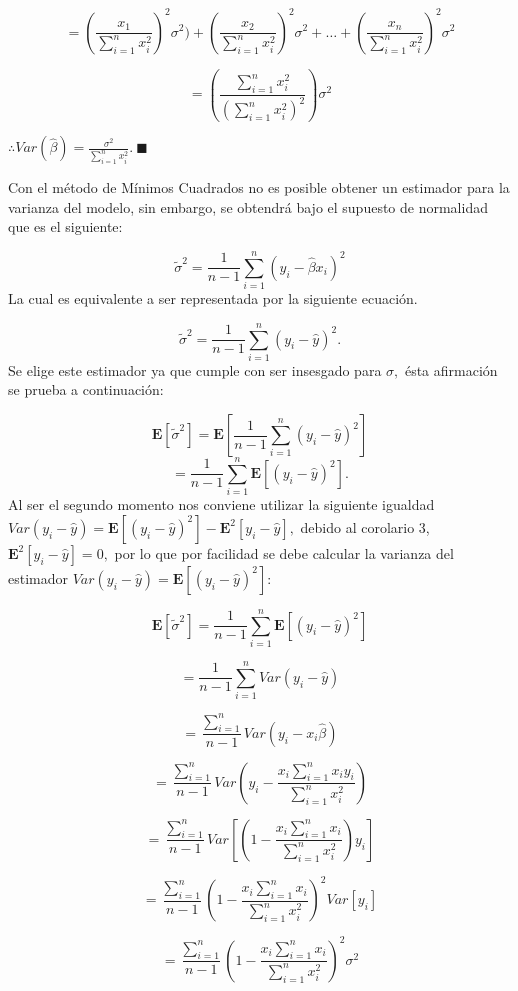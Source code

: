 \documentclass[
  a4paper,
  oneside,
  openany]{book}
\begin{document}
\[=\left(\frac{x_{1}}{\sum_{i=1}^{n}x_{i}^2}\right)^2\sigma^2) + \left(\frac{x_{2}}{\sum_{i=1}^{n}x_{i}^2}\right)^2\sigma^2 + \ldots + \left(\frac{x_{n}}{\sum_{i=1}^{n}x_{i}^2}\right)^2\sigma^2\]

\[=\left(\frac{\sum_{i=1}^{n}x_{i}^2}{(\sum_{i=1}^{n}x_{i}^2)^2}\right)\sigma^2\]

\(\therefore Var\left( \hat{\beta}\right)=\frac{\sigma^2}{\sum_{i=1}^{n}x_{i}^2}. \ \blacksquare\)

Con el método de Mínimos Cuadrados no es posible obtener un estimador para la varianza del modelo, sin embargo, se obtendrá bajo el supuesto de normalidad que es el siguiente:

\[\tilde{\sigma}^2=\frac{1}{n-1}\sum_{i=1}^{n}\left(y_{i}-\hat{\beta}x_{i}\right)^2\]
La cual es equivalente a ser representada por la siguiente ecuación.

\[\tilde{\sigma}^2=\frac{1}{n-1}\sum_{i=1}^{n}(y_{i}-\hat{y})^2.\]
Se elige este estimador ya que cumple con ser insesgado para \(\sigma,\) ésta afirmación se prueba a continuación:

\[\mathbf{E}[\tilde{\sigma}^2]=\mathbf{E}\left[\frac{1}{n-1}\sum_{i=1}^{n}(y_{i}-\hat{y})^2\right]\]
\[=\frac{1}{n-1}\sum_{i=1}^{n}\mathbf{E}\left[(y_{i}-\hat{y})^2\right].\]
Al ser el segundo momento nos conviene utilizar la siguiente igualdad \(Var(y_{i}-\hat{y})=\mathbf{E}[(y_{i}-\hat{y})^2]-\mathbf{E}^2[y_{i}-\hat{y}],\) debido al corolario 3, \(\mathbf{E}^2[y_{i}-\hat{y}]=0,\) por lo que por facilidad se debe calcular la varianza del estimador \(Var(y_{i}-\hat{y})=\mathbf{E}[(y_{i}-\hat{y})^2]:\)

\[\mathbf{E}[\tilde{\sigma}^2]=\frac{1}{n-1}\sum_{i=1}^{n}\mathbf{E}\left[(y_{i}-\hat{y})^2\right]\]

\[=\frac{1}{n-1}\sum_{i=1}^{n}Var(y_{i}-\hat{y})\]

\[=\frac{\sum_{i=1}^{n}}{n-1}Var(y_{i}-x_{i}\hat{\beta})\]

\[=\frac{\sum_{i=1}^{n}}{n-1}Var\left(y_{i}-\frac{x_{i}\sum_{i=1}^{n}x_{i}y_{i}}{\sum_{i=1}^{n}x_{i}^2}\right)\]

\[=\frac{\sum_{i=1}^{n}}{n-1}Var\left[\left(1-\frac{x_{i}\sum_{i=1}^{n}x_{i}}{\sum_{i=1}^{n}x_{i}^2}\right)y_{i}\right]\]

\[=\frac{\sum_{i=1}^{n}}{n-1}\left(1-\frac{x_{i}\sum_{i=1}^{n}x_{i}}{\sum_{i=1}^{n}x_{i}^2}\right)^2Var[y_{i}]\]

\[=\frac{\sum_{i=1}^{n}}{n-1}\left(1-\frac{x_{i}\sum_{i=1}^{n}x_{i}}{\sum_{i=1}^{n}x_{i}^2}\right)^2\sigma^2\]
\end{document}
